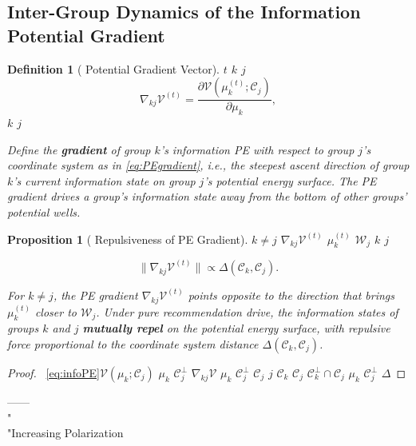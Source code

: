 \documentclass[11pt,a4paper]{article}
\newtheorem{proposition}[theorem]{Proposition}
\newtheorem{definition}[theorem]{Definition}
\theoremstyle{remark}
\newcommand{\CoordSys}{\mathcal{C}}
\newcommand{\InfoPE}{\mathcal{V}}
\begin{document}
\subsection{}

\subsection{Inter-Group Dynamics of the Information Potential Gradient}

\begin{definition}[ Potential Gradient Vector]
 $t$  $k$  $j$ \textbf{}
\begin{equation}\label{eq:PEgradient}
\nabla_{kj} \InfoPE^{(t)} = \frac{\partial \InfoPE(\mu_k^{(t)}; \CoordSys_j)}{\partial \mu_k},
\end{equation}
 $k$  $j$ 


Define the \textbf{gradient} of group $k$'s information PE with respect to group $j$'s
coordinate system as in \eqref{eq:PEgradient}, i.e., the steepest ascent direction of
group $k$'s current information state on group $j$'s potential energy surface. The PE
gradient drives a group's information state away from the bottom of other groups'
potential wells.
\end{definition}

\begin{proposition}[ Repulsiveness of PE Gradient]
\label{prop:repulsive}
 $k \neq j$ $\nabla_{kj} \InfoPE^{(t)}$ 
$\mu_k^{(t)}$  $\mathcal{W}_j$ 
 $k$  $j$ \textbf{}

\[
\|\nabla_{kj} \InfoPE^{(t)}\| \propto \Delta(\CoordSys_k, \CoordSys_j).
\]

For $k \neq j$, the PE gradient $\nabla_{kj} \InfoPE^{(t)}$ points opposite to the
direction that brings $\mu_k^{(t)}$ closer to $\mathcal{W}_j$. Under pure recommendation
drive, the information states of groups $k$ and $j$ \textbf{mutually repel} on the
potential energy surface, with repulsive force proportional to the coordinate system
distance $\Delta(\CoordSys_k, \CoordSys_j)$.
\end{proposition}

\begin{proof}
~\eqref{eq:infoPE}$\InfoPE(\mu_k; \CoordSys_j)$  $\mu_k$ 
$\CoordSys_j^\perp$ 
 $\nabla_{kj} \InfoPE$  $\mu_k$  $\CoordSys_j^\perp$ 
 $\CoordSys_j$ $j$ 
 $\CoordSys_k$  $\CoordSys_j$ 
$\CoordSys_k^\perp \cap \CoordSys_j$ 
$\mu_k$  $\CoordSys_j^\perp$  $\Delta$
\end{proof}


\textbf{}——
\textbf{}
\\"\\"Increasing Polarization
\end{document}

